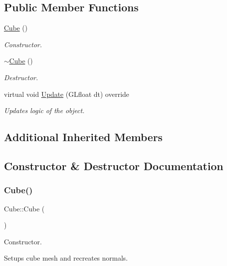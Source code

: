 \subsection*{Public Member Functions}
\begin{DoxyCompactItemize}
\item 
\mbox{\hyperlink{class_cube_a06f3d86fb63e3aad08623610aa3c17b4}{Cube}} ()
\begin{DoxyCompactList}\small\item\em Constructor. \end{DoxyCompactList}\item 
\mbox{\hyperlink{class_cube_aa814e979cecb8c451fdb332ded2cea1e}{$\sim$\+Cube}} ()
\begin{DoxyCompactList}\small\item\em Destructor. \end{DoxyCompactList}\item 
virtual void \mbox{\hyperlink{class_cube_a52a6950310f4529d9a3df4bc60c0625b}{Update}} (G\+Lfloat dt) override
\begin{DoxyCompactList}\small\item\em Updates logic of the object. \end{DoxyCompactList}\end{DoxyCompactItemize}
\subsection*{Additional Inherited Members}


\subsection{Constructor \& Destructor Documentation}
\mbox{\label{class_cube_a06f3d86fb63e3aad08623610aa3c17b4}} 
\subsubsection{\texorpdfstring{Cube()}{Cube()}}
{\footnotesize\ttfamily Cube\+::\+Cube (\begin{DoxyParamCaption}{ }\end{DoxyParamCaption})}



Constructor. 

Setups cube mesh and recreates normals. \mbox{\label{class_cube_aa814e979cecb8c451fdb332ded2cea1e}} 
